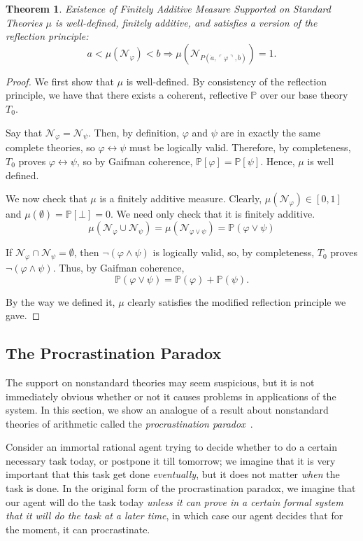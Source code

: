 \documentclass[12pt]{article}
\theoremstyle{plain}
\newtheorem{theorem}{Theorem}[subsection]
\theoremstyle{definition}
\theoremstyle{remark}
\newif\ifprocrastinate
\begin{document}
\begin{theorem} \emph{Existence of Finitely Additive Measure Supported on Standard Theories}
$\mu$ is well-defined, finitely additive, and satisfies a version of the reflection principle:
$$a < \mu(\mathcal{N}_{\varphi}) < b \Rightarrow \mu(\mathcal{N}_{P(\dot a, \ulcorner \varphi \urcorner,\dot b)}) = 1.$$
\end{theorem}
\begin{proof}
We first show that $\mu$ is well-defined. By consistency of the reflection principle, we have that there exists a coherent, reflective $\mathbb{P}$ over our base theory $T_0$.

Say that $\mathcal{N}_{\varphi}=\mathcal{N}_{\psi}$. Then, by definition, $\varphi$ and $\psi$ are in exactly the same complete theories, so $\varphi\leftrightarrow\psi$ must be logically valid. Therefore, by completeness, $T_0$ proves $\varphi\leftrightarrow\psi$, so by Gaifman coherence, $\mathbb{P}[\varphi]=\mathbb{P}[\psi]$. Hence, $\mu$ is well defined.

We now check that $\mu$ is a finitely additive measure. Clearly, $\mu(\mathcal{N}_{\varphi})\in[0,1]$ and $\mu(\emptyset)=\mathbb{P}[\bot]=0$.
We need only check that it is finitely additive.
$$\mu(\mathcal{N}_{\varphi}\cup \mathcal{N}_{\psi})=\mu(\mathcal{N}_{\varphi\vee\psi})=\mathbb{P}(\varphi\vee\psi)$$

If $\mathcal{N}_{\varphi}\cap \mathcal{N}_{\psi}=\emptyset$, then $\neg(\varphi\wedge\psi)$ is logically valid, so, by completeness, $T_0$ proves $\neg(\varphi\wedge\psi)$. Thus, by Gaifman coherence,
$$\mathbb{P}(\varphi\vee\psi)=\mathbb{P}(\varphi)+\mathbb{P}(\psi).$$

By the way we defined it, $\mu$ clearly satisfies the modified reflection principle we gave.
\end{proof}

\ifprocrastinate
\subsection{The Procrastination Paradox}
The support on nonstandard theories may seem suspicious, but it is not immediately obvious whether or not it causes problems in applications of the system. In this section, we show an analogue of a result about nonstandard theories of arithmetic called the \emph{procrastination paradox}~\cite{yudkowsky13}. 

Consider an immortal rational agent trying to decide whether to do a certain necessary task today, or postpone it till tomorrow; we imagine that it is very important that this task get done \emph{eventually}, but it does not matter \emph{when} the task is done. In the original form of the procrastination paradox, we imagine that our agent will do the task today \emph{unless it can prove in a certain formal system that it will do the task at a later time}, in which case our agent decides that for the moment, it can procrastinate.
\end{document}
